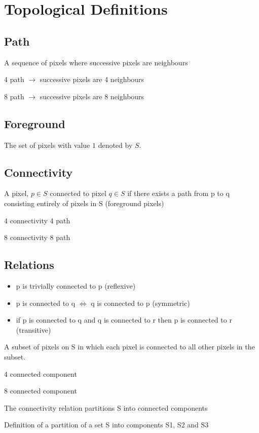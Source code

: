 \documentclass[11pt]{article}
\theoremstyle{definition}
\begin{document}
\newpage
\section{Topological Definitions}
\subsection{Path}
A sequence of pixels where successive pixels are neighbours

4 path $\rightarrow$ successive pixels are 4 neighbours 

8 path $\rightarrow$ successive pixels are 8 neighbours

\subsection{Foreground}
The set of pixels with value $1$ denoted by $S$.

\subsection{Connectivity}
A pixel, $p \in S$ connected to pixel  $q\in S$  if there exists a path from p to q consisting entirely of pixels in S (foreground pixels) 

4 connectivity 4 path

8 connectivity 8 path

\subsection{Relations}
\begin{itemize}
    \item p is trivially connected to p (reflexive)
    \item p is connected to q $\Longleftrightarrow$  q is connected to p (symmetric)
    \item if p is connected to q and q is connected to r then p is connected to r (transitive)
\end{itemize}

A subset of pixels on S in which each pixel is connected to all other pixels in the subset.

4 connected component

8 connected component

The connectivity relation partitions S into connected components

Definition of a partition of a set S into components S1, S2 and S3
\end{document}
